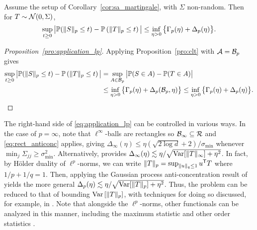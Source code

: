 \begin{proposition}
  \label{pro:application_lp}

  Assume the setup of Corollary~\ref{cor:sa_martingale},
  with $\Sigma$ non-random. Then for $T \sim \mathcal{N}(0, \Sigma)$,
  \begin{equation}%
    \label{eq:application_lp}
    \sup_{t \geq 0}
    \big| \P( \|S\|_p \leq t )
    - \P\left( \|T\|_p \leq t \right) \big|
    \leq \inf_{\eta>0}
    \big\{\Gamma_p(\eta) + \Delta_p(\eta) \big\}.
  \end{equation}
\end{proposition}

\begin{proof}[Proposition~\ref{pro:application_lp}]

  Applying Proposition~\ref{pro:clt}
  with $\mathcal{A}=\mathcal{B}_p$ gives
  \begin{align*}
    \sup_{t \geq 0}
    \big| \mathbb{P}( \|S\|_p \leq t )
    - \mathbb{P}\left( \|T\|_p \leq t \right) \big|
    &= \sup_{A\in \mathcal{B}_p}
    \big|\mathbb{P}(S\in A) -\mathbb{P}(T\in A)\big| \\
    &\leq
    \inf_{\eta>0}
    \big\{\Gamma_p(\eta) + \Delta_p(\mathcal{B}_p, \eta) \big\}
    \leq
    \inf_{\eta>0}
    \big\{\Gamma_p(\eta) + \Delta_p(\eta) \big\}.
  \end{align*}
\end{proof}

The right-hand side of
\eqref{eq:application_lp} can be controlled in various ways.
%
In the case of $p=\infty$,
note that $\ell^\infty$-balls are rectangles so
$\mathcal{B}_\infty\subseteq \mathcal{R}$
and \eqref{eq:rect_anticonc} applies, giving
$\Delta_\infty(\eta) \leq \eta (\sqrt{2\log d} + 2) / \sigma_{\min}$
whenever $\min_j \Sigma_{j j} \geq \sigma_{\min}^2$.
Alternatively, \citet[Theorem~1]{giessing2023anti} provides
$\Delta_\infty(\eta) \lesssim \eta / \sqrt{\operatorname{Var}[\|T\|_\infty] + \eta^2}$.
In fact, by H{\"o}lder duality of $\ell^p$-norms, we can write
$\|T\|_p = \sup_{\|u\|_q \leq 1} u^{\mathsf{T}} T$ where
$1/p + 1/q = 1$.
Then, applying the Gaussian process anti-concentration result of
\citet[Theorem~2]{giessing2023anti} yields the more general
$\Delta_p(\eta) \lesssim \eta / \sqrt{\operatorname{Var}[\|T\|_p] + \eta^2}$.
Thus, the problem can be reduced to that of bounding
$\operatorname{Var}\left[\|T\|_p\right]$, with techniques for doing so
discussed, for example, in
\citet[Section~4]{giessing2023anti}.
Note that alongside the $\ell^p$-norms,
other functionals can be analyzed in this manner,
including the maximum statistic
and other order statistics
\citep{kozbur2021dimension,giessing2023anti}.

